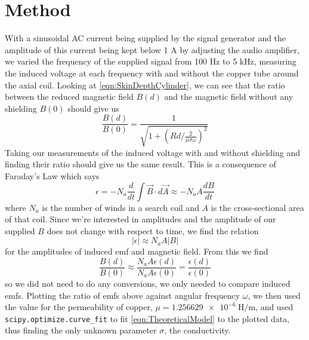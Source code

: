 \documentclass[12pt]{article}
\numberwithin{equation}{section}
\numberwithin{figure}{section}
\begin{document}
    \section{Method}\label{sec:Method}
    With a sinusoidal AC current being supplied by the signal generator and the amplitude of this 
    current being kept below 1 A by adjusting the audio amplifier, we varied the frequency 
    of the supplied signal from 100 Hz to 5 kHz, measuring the induced voltage at each frequency 
    with and without the copper tube around the axial coil. Looking at \autoref{eqn:SkinDepthCylinder}, 
    we can see that the ratio between the reduced magnetic field $B(d)$ and the magnetic field 
    without any shielding $B(0)$ should give us
    \begin{equation}
        \frac{B(d)}{B(0)}=\frac{1}{\sqrt{1+(Rd/\frac{2}{\mu\sigma\omega})^2}}
        \label{eqn:TheoreticalModel}
    \end{equation}
    Taking our measurements of the induced voltage with and without shielding and finding their 
    ratio should give us the same result. This is a consequence of Faraday's Law which says 
    \begin{equation}
        \epsilon = -N_a \frac{d}{dt}\int \vec{B}\cdot d\vec{A}\approx-N_a A \frac{dB}{dt}
        \label{eqn:FaradaysLaw}
    \end{equation}
    where $N_a$ is the number of winds in a search coil and $A$ is the cross-sectional area of 
    that coil. Since we're interested in amplitudes and the amplitude of our supplied $B$ does 
    not change with respect to time, we find the relation 
    \begin{equation}
        |\epsilon|\approx N_a A |B|
        \label{eqn:emfToB}
    \end{equation}
    for the amplitudes of induced emf and magnetic field. From this we find 
    \begin{equation*}
        \frac{B(d)}{B(0)}\approx \frac{N_a A \epsilon(d)}{N_a A \epsilon(0)}=\frac{\epsilon(d)}{\epsilon(0)}
    \end{equation*}
    so we did not need to do any conversions, we only needed to compare induced emfs. Plotting the 
    ratio of emfs above against angular frequency $\omega$, we then used the value for the 
    permeability of copper, $\mu=\SI{1.256629e-6}{\henry/\metre}$, and used 
    \texttt{scipy.optimize.curve\_fit} to fit \autoref{eqn:TheoreticalModel} to the plotted data, 
    thus finding the only unknown parameter $\sigma$, the conductivity. 
\end{document}
